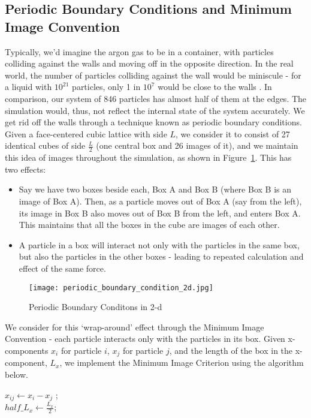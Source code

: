 \documentclass[../Main.tex]{subfiles}
\begin{document}
\subsection{Periodic Boundary Conditions and Minimum Image Convention}
Typically, we'd imagine the argon gas to be in a container, with particles colliding against the walls and moving off in the opposite direction. In the real world, the number of particles colliding against the wall would be miniscule - for a liquid with $10^{21}$ particles, only 1 in $10^{7}$ would be close to the walls \cite{Rapaport2004}. In comparison, our system of 846 particles has almost half of them at the edges. The simulation would, thus, not reflect the internal state of the system accurately. We get rid off the walls through a technique known as periodic boundary conditions.
Given a face-centered cubic lattice with side $L$, we consider it to consist of 27 identical cubes of side $\frac{L}{2}$ (one central box and 26 images of it), and we maintain this idea of images throughout the simulation, as shown in Figure~\ref{periodic_boundary_condition_2d}. This has two effects: 
	\begin{itemize}
	\item
	Say we have two boxes beside each, Box A and Box B (where Box B is an image of Box A). Then, as a particle moves out of Box A (say from the left), its image in Box B also moves out of Box B from the left, and enters Box A. This maintains that all the boxes in the cube are images of each other.
	\item
	A particle in a box will interact not only with the particles in the same box, but also the particles in the other boxes - leading to repeated calculation and effect of the same force.
	\end{itemize}

\begin{figure}[t]
\centering
	\texttt{[image: periodic\_boundary\_condition\_2d.jpg]}
  	\caption{Periodic Boundary Conditons in 2-d}
	\label{periodic_boundary_condition_2d}
\end{figure}

We consider for this `wrap-around' effect through the Minimum Image Convention - each particle interacts only with the particles in its box. Given x-components $x_{i}$ for particle $i$, $x_{j}$ for particle $j$, and the length of the box in the x-component, $L_{x}$, we implement the Minimum Image Criterion using the algorithm below.

\begin{algorithm}[H]
\SetAlgoLined
{}

\BlankLine

$x_{ij} \leftarrow x_{i} - x_{j}$ ;\\
$half\_L_{x} \leftarrow \frac{L_{x}}{2}$; \\
\caption{Minimum Image Convention in 1-d}
\label{algorithm:minimum_image_convention}
\end{algorithm}
\end{document}
